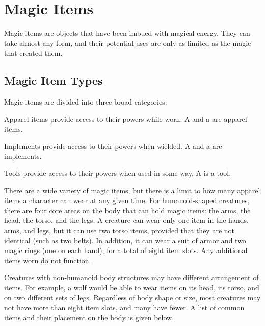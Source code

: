 \chapter{Magic Items}
Magic items are objects that have been imbued with magical energy. They can take almost any form, and their potential uses are only as limited as the magic that created them.

\section{Magic Item Types}
Magic items are divided into three broad categories:
\begin{itemize*}
  \item Apparel items provide access to their powers while worn. A  and a  are apparel items.
  \item Implements provide access to their powers when wielded. A  and a  are implements.
  \item Tools provide access to their powers when used in some way. A  is a tool.
\end{itemize*}

 There are a wide variety of magic items, but there is a limit to how many apparel items a character can wear at any given time. For humanoid-shaped creatures, there are four core areas on the body that can hold magic items: the arms, the head, the torso, and the legs. A creature can wear only one item in the hands, arms, and legs, but it can use two torso items, provided that they are not identical (such as two belts). In addition, it can wear a suit of armor and two magic rings (one on each hand), for a total of eight item slots. Any additional items worn do not function.

Creatures with non-humanoid body structures may have different arrangement of items. For example, a wolf would be able to wear items on its head, its torso, and on two different sets of legs. Regardless of body shape or size, most creatures may not have more than eight item slots, and many have fewer. A list of common items and their placement on the body is given below.


